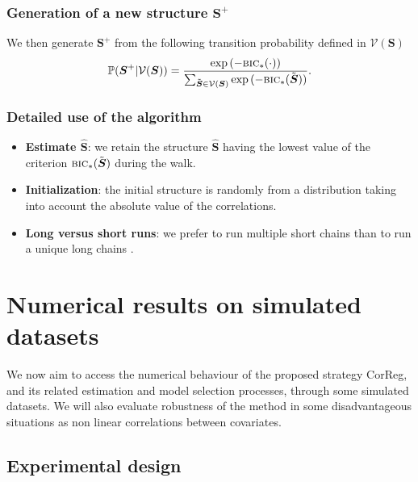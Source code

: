 \documentclass[11pt,a4paper]{article}
\begin{document}
	\subsubsection{Generation of a new structure $\boldsymbol{S}^+$}
	
We then generate $\boldsymbol{S}^+$ from the following transition probability defined in  $\mathcal{V}(\boldsymbol{S})$
	\begin{equation}
	\mathbb{P}(\boldsymbol{S}^+|\mathcal{V}(\boldsymbol{S})) = \frac{\exp{(-\mbox{{\sc bic}}_*(\cdot))}}{\sum_{\tilde{\boldsymbol{S}}\in \mathcal{V}(\boldsymbol{S})}\exp{(-\mbox{{\sc bic}}_*(\tilde{\boldsymbol{S}}))}}.
	\end{equation}
	
 \subsubsection{Detailed use of the algorithm}

\begin{itemize}
\item {\bf Estimate $\hat{\boldsymbol{S}}$}: we retain the structure $\hat{\boldsymbol{S}}$ having the lowest value of the criterion $\mbox{{\sc bic}}_*(\tilde{\boldsymbol{S}})$ during the walk.
\item {\bf Initialization}: the initial structure is randomly from a distribution taking into account the absolute value of the correlations.
\item {\bf Long versus short runs}: we prefer to run multiple short chains than to run a unique long chains \cite{gilks1996markov}.
\end{itemize} 
	
\section{Numerical results on simulated datasets} \label{sectionsimul}

We now aim to access the numerical behaviour of the proposed strategy {\sc CorReg}, and its related estimation and model selection processes, through some simulated datasets. We will also evaluate robustness of the method in some disadvantageous situations as non linear correlations between covariates.

	\subsection{Experimental design}
	
\end{document}

